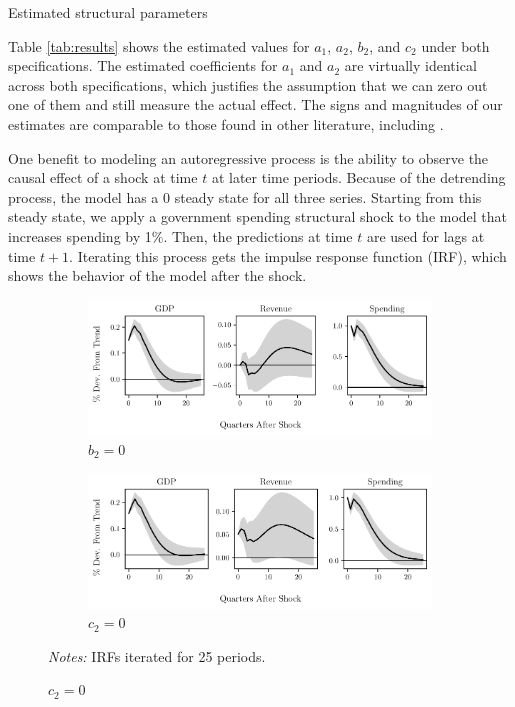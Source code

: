 \begin{table}[t]
    \centering
    \caption{Estimated structural parameters}
    
    \label{tab:results}
\end{table}

Table \ref{tab:results} shows the estimated values for $a_1$, $a_2$, $b_2$, and $c_2$ under both specifications. The estimated coefficients for $a_1$ and $a_2$ are virtually identical across both specifications, which justifies the assumption that we can zero out one of them and still measure the actual effect. The signs and magnitudes of our estimates are comparable to those found in other literature, including \textcite{blanchard2002empirical}.

One benefit to modeling an autoregressive process is the ability to observe the causal effect of a shock at time $t$ at later time periods. Because of the detrending process, the model has a 0 steady state for all three series. Starting from this steady state, we apply a government spending structural shock to the model that increases spending by 1\%. Then, the predictions at time $t$ are used for lags at time $t + 1$. Iterating this process gets the impulse response function (IRF), which shows the behavior of the model after the shock.

\begin{figure}[t!]
    \centering
    \caption{Estimated IRFs for a structural government spending shock}
    \begin{subfigure}{\textwidth}
        \includegraphics{figures/b20_irf.pdf}
        \caption{$b_2 = 0$}
    \end{subfigure}

    \begin{subfigure}{\textwidth}
        \includegraphics{figures/c20_irf.pdf}
        \caption{$c_2 = 0$}
    \end{subfigure}

    {\scriptsize \emph{Notes:} IRFs iterated for 25 periods.}
    \label{fig:irfs}
\end{figure}

